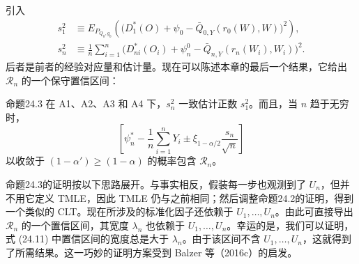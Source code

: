 引入
\[
 \begin{aligned}
 s_1^2&\equiv E_{P_{Q_0,g_0}}\left(\bigl(D_1^*(O)+\psi_0-\bar Q_{0,Y}(r_0(W),W)\bigr)^2\right),\\
 s_n^2&\equiv\frac1n\sum_{i=1}^n\bigl(D_{ni}^*(O_i)+\psi_n^0-\bar Q_{n,Y}(r_n(W_i),W_i)\bigr)^2.
 \end{aligned}
\]
后者是前者的经验对应量和估计量。现在可以陈述本章的最后一个结果，它给出 $\mathcal R_n$ 的一个保守置信区间：

\begin{bookresult}{命题}{24.3}
在 A1、A2、A3 和 A4 下，$s_n^2$ 一致估计正数 $s_1^2$。而且，当 $n$ 趋于无穷时，
\begin{equation}
 \left[\psi_n^*-\frac1n\sum_{i=1}^nY_i\pm\xi_{1-\alpha/2}\frac{s_n}{\sqrt n}\right]
 \tag{24.11}
\end{equation}
以收敛于 $(1-\alpha')\geq(1-\alpha)$ 的概率包含 $\mathcal R_n$。
\end{bookresult}

命题24.3的证明按以下思路展开。与事实相反，假装每一步也观测到了 $U_n$，但并不用它定义 TMLE，因此 TMLE 仍与之前相同；然后调整命题24.2的证明，得到一个类似的 CLT。现在所涉及的标准化因子还依赖于 $U_1,\ldots,U_n$。由此可直接导出 $\mathcal R_n$ 的一个置信区间，其宽度 $\lambda_n$ 也依赖于 $U_1,\ldots,U_n$。幸运的是，我们可以证明，式 (24.11) 中置信区间的宽度总是大于 $\lambda_n$。由于该区间不含 $U_1,\ldots,U_n$，这就得到了所需结果。这一巧妙的证明方案受到 Balzer 等（2016c）的启发。
